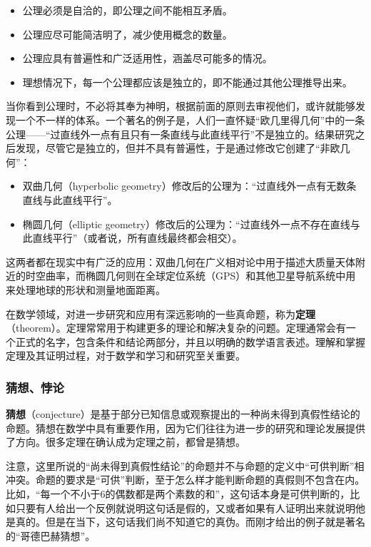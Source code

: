 \begin{itemize}
\item 公理必须是自洽的，即公理之间不能相互矛盾。
\item 公理应尽可能简洁明了，减少使用概念的数量。
\item 公理应具有普遍性和广泛适用性，涵盖尽可能多的情况。
\item 理想情况下，每一个公理都应该是独立的，即不能通过其他公理推导出来。
\end{itemize}

当你看到公理时，不必将其奉为神明，根据前面的原则去审视他们，或许就能够发现一个不一样的体系。一个著名的例子是，人们一直怀疑“欧几里得几何”中的一条公理——“过直线外一点有且只有一条直线与此直线平行”不是独立的。结果研究之后发现，尽管它是独立的，但并不具有普遍性，于是通过修改它创建了“非欧几何”：

\begin{itemize}
\item 双曲几何（hyperbolic geometry）修改后的公理为：“过直线外一点有无数条直线与此直线平行”。
\item 椭圆几何（elliptic geometry）修改后的公理为：“过直线外一点不存在直线与此直线平行”（或者说，所有直线最终都会相交）。
\end{itemize}

这两者都在现实中有广泛的应用：双曲几何在广义相对论中用于描述大质量天体附近的时空曲率，而椭圆几何则在全球定位系统（GPS）和其他卫星导航系统中用来处理地球的形状和测量地面距离。

在数学领域，对进一步研究和应用有深远影响的一些真命题，称为\textbf{定理}（theorem）。定理常常用于构建更多的理论和解决复杂的问题。定理通常会有一个正式的名字，包含条件和结论两部分，并且以明确的数学语言表述。理解和掌握定理及其证明过程，对于数学和学习和研究至关重要。

\subsubsection{猜想、悖论}

\textbf{猜想}（conjecture）是基于部分已知信息或观察提出的一种尚未得到真假性结论的命题。猜想在数学中具有重要作用，因为它们往往为进一步的研究和理论发展提供了方向。很多定理在确认成为定理之前，都曾是猜想。

注意，这里所说的“尚未得到真假性结论”的命题并不与命题的定义中“可供判断”相冲突。命题的要求是“可供”判断，至于怎么样才能判断命题的真假则不包含在内。比如，“每一个不小于6的偶数都是两个素数的和”，这句话本身是可供判断的，比如只要有人给出一个反例就说明这句话是假的，又或者如果有人证明出来就说明他是真的。但是在当下，这句话我们尚不知道它的真伪。而刚才给出的例子就是著名的“哥德巴赫猜想”。

